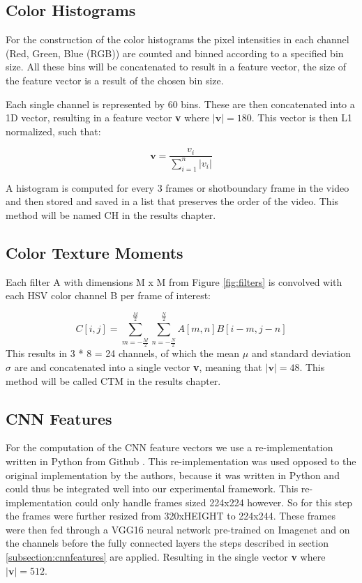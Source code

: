 \documentclass{report}
\begin{document}
\subsection{Color Histograms}
For the construction of the color histograms the pixel intensities in each channel (Red, Green, Blue (RGB)) are counted and binned according to a specified bin size. All these bins will be concatenated to result in a feature vector, the size of the feature vector is a result of the chosen bin size.

Each single channel is represented by 60 bins. These are then concatenated into a 1D vector, resulting in a feature vector \textbf{v} where $|\textbf{v}| = 180$. This vector is then L1 normalized, such that:

\[\textbf{v} = \frac{v_i}{\sum_{i=1}^{n}|v_i|}\]

A histogram is computed for every 3 frames or shotboundary frame in the video and then stored and saved in a list that preserves the order of the video. This method will be named CH in the results chapter.

\subsection{Color Texture Moments}

Each filter A with dimensions M x M from Figure \ref{fig:filters} is convolved with each HSV color channel B per frame of interest:

\[ C[i,j] = \sum_{m=-\frac{M}{2}}^{\frac{M}{2}}\sum_{n=-\frac{N}{2}}^{\frac{N}{2}} A[m, n] B[i-m, j-n] \]
This results in 3 * 8 = 24 channels, of which the mean $\mu$ and standard deviation $\sigma$ are and concatenated into a single vector \textbf{v}, meaning that $|\textbf{v}| = 48$. This method will be called CTM in the results chapter. 

\subsection{CNN Features}
For the computation of the CNN feature vectors we use a re-implementation written in Python from Github \cite{rmac-github}. This re-implementation was used opposed to the original implementation by the authors, because it was written in Python and could thus be integrated well into our experimental framework. This re-implementation could only handle frames sized 224x224 however. So for this step the frames were further resized from 320xHEIGHT to 224x244. These frames were then fed through a VGG16 neural network pre-trained on Imagenet and on the channels before the fully connected layers the steps described in section \ref{subsection:cnnfeatures} are applied. Resulting in the single vector \textbf{v} where $|\textbf{v}| = 512$.
\end{document}
